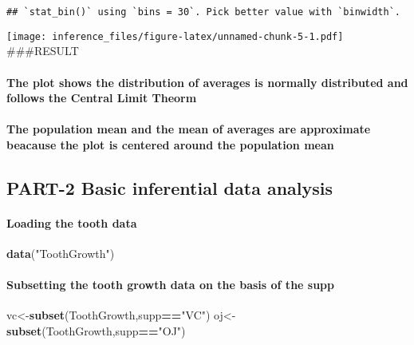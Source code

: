 \documentclass[]{article}
\newenvironment{Shaded}{\begin{snugshade}}{\end{snugshade}}
\newcommand{\KeywordTok}[1]{\textcolor[rgb]{0.13,0.29,0.53}{\textbf{#1}}}
\newcommand{\StringTok}[1]{\textcolor[rgb]{0.31,0.60,0.02}{#1}}
\newcommand{\OperatorTok}[1]{\textcolor[rgb]{0.81,0.36,0.00}{\textbf{#1}}}
\newcommand{\NormalTok}[1]{#1}
\let\oldparagraph\paragraph
\renewcommand{\paragraph}[1]{\oldparagraph{#1}\mbox{}}
\begin{document}
\begin{verbatim}
## `stat_bin()` using `bins = 30`. Pick better value with `binwidth`.
\end{verbatim}

\texttt{[image: inference\_files/figure-latex/unnamed-chunk-5-1.pdf]}
\#\#\#RESULT

\paragraph{The plot shows the distribution of averages is normally
distributed and follows the Central Limit
Theorm}\label{the-plot-shows-the-distribution-of-averages-is-normally-distributed-and-follows-the-central-limit-theorm}

\paragraph{The population mean and the mean of averages are approximate
beacause the plot is centered around the population
mean}\label{the-population-mean-and-the-mean-of-averages-are-approximate-beacause-the-plot-is-centered-around-the-population-mean}

\subsection{PART-2 Basic inferential data
analysis}\label{part-2-basic-inferential-data-analysis}

\paragraph{Loading the tooth data}\label{loading-the-tooth-data}

\begin{Shaded}
\begin{Highlighting}[]
\KeywordTok{data}\NormalTok{(}\StringTok{"ToothGrowth"}\NormalTok{)}
\end{Highlighting}
\end{Shaded}

\paragraph{Subsetting the tooth growth data on the basis of the
supp}\label{subsetting-the-tooth-growth-data-on-the-basis-of-the-supp}

\begin{Shaded}
\begin{Highlighting}[]
\NormalTok{vc<-}\KeywordTok{subset}\NormalTok{(ToothGrowth,supp}\OperatorTok{==}\StringTok{"VC"}\NormalTok{)}
\NormalTok{oj<-}\KeywordTok{subset}\NormalTok{(ToothGrowth,supp}\OperatorTok{==}\StringTok{"OJ"}\NormalTok{)}
\end{Highlighting}
\end{Shaded}
\end{document}
